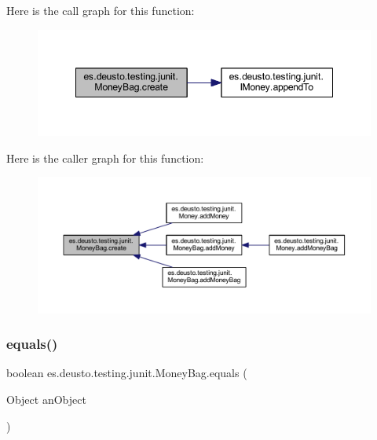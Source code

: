 Here is the call graph for this function\+:\nopagebreak
\begin{figure}[H]
\begin{center}
\leavevmode
\includegraphics[width=348pt]{classes_1_1deusto_1_1testing_1_1junit_1_1_money_bag_a8d2d54a342d2de2b75530600123efc9a_cgraph}
\end{center}
\end{figure}
Here is the caller graph for this function\+:\nopagebreak
\begin{figure}[H]
\begin{center}
\leavevmode
\includegraphics[width=350pt]{classes_1_1deusto_1_1testing_1_1junit_1_1_money_bag_a8d2d54a342d2de2b75530600123efc9a_icgraph}
\end{center}
\end{figure}
\mbox{\label{classes_1_1deusto_1_1testing_1_1junit_1_1_money_bag_a80926d10c9619bd2ad84eabe52ca03bb}} 
\subsubsection{\texorpdfstring{equals()}{equals()}}
{\footnotesize\ttfamily boolean es.\+deusto.\+testing.\+junit.\+Money\+Bag.\+equals (\begin{DoxyParamCaption}\item[{Object}]{an\+Object }\end{DoxyParamCaption})}




